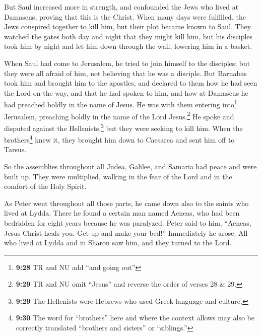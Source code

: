 But Saul increased more in strength, and confounded the
Jews who lived at Damascus, proving that this is the Christ.
 When many days were fulfilled, the Jews conspired
together to kill him,  but their plot became known to
Saul. They watched the gates both day and night that they might kill
him,  but his disciples took him by night and let him
down through the wall, lowering him in a basket.

 When Saul had come to Jerusalem, he tried to join
himself to the disciples; but they were all afraid of him, not believing
that he was a disciple.  But Barnabas took him and
brought him to the apostles, and declared to them how he had seen the
Lord on the way, and that he had spoken to him, and how at Damascus he
had preached boldly in the name of Jesus.  He was with
them entering into\footnote{\textbf{9:28} TR and NU add ``and going
  out''} Jerusalem,  preaching boldly in the name of the
Lord Jesus.\footnote{\textbf{9:29} TR and NU omit ``Jesus'' and reverse
  the order of verses 28 \& 29.} He spoke and disputed against the
Hellenists,\footnote{\textbf{9:29} The Hellenists were Hebrews who used
  Greek language and culture.} but they were seeking to kill him.
 When the brothers\footnote{\textbf{9:30} The word for
  ``brothers'' here and where the context allows may also be correctly
  translated ``brothers and sisters'' or ``siblings.''} knew it, they
brought him down to Caesarea and sent him off to Tarsus.

 So the assemblies throughout all Judea, Galilee, and
Samaria had peace and were built up. They were multiplied, walking in
the fear of the Lord and in the comfort of the Holy Spirit.

 As Peter went throughout all those parts, he came down
also to the saints who lived at Lydda.  There he found a
certain man named Aeneas, who had been bedridden for eight years because
he was paralyzed.  Peter said to him, ``Aeneas, Jesus
Christ heals you. Get up and make your bed!'' Immediately he arose.
 All who lived at Lydda and in Sharon saw him, and they
turned to the Lord.

